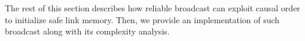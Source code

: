 
%     


The rest of this section describes how reliable broadcast can exploit causal
order to initialize safe link memory. Then, we provide an implementation of such
broadcast along with its complexity analysis.


